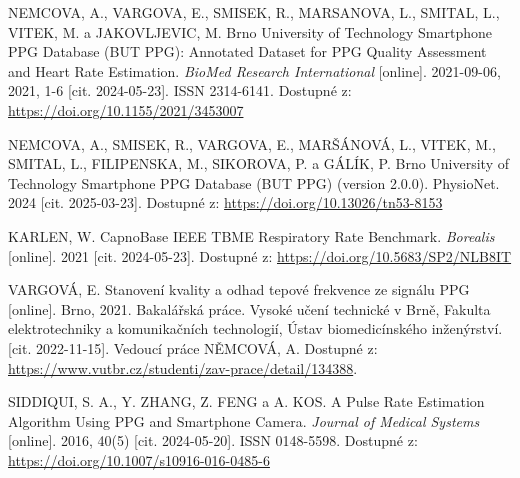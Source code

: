 

\begin{thebibliography}{99}

		NEMCOVA, A., VARGOVA, E., SMISEK, R., MARSANOVA, L., SMITAL, L., VITEK, M. a JAKOVLJEVIC, M.
		Brno University of Technology Smartphone PPG Database (BUT PPG): Annotated Dataset for PPG Quality Assessment and Heart Rate Estimation.
		\emph{BioMed Research International} [online].
		2021-09-06, 2021, 1-6 [cit. 2024-05-23].
		ISSN 2314-6141.
		Dostupné z: \url{https://doi.org/10.1155/2021/3453007}

		NEMCOVA, A., SMISEK, R., VARGOVA, E., MARŠÁNOVÁ, L., VITEK, M., SMITAL, L., FILIPENSKA, M., SIKOROVA, P. a GÁLÍK, P.
		Brno University of Technology Smartphone PPG Database (BUT PPG) (version 2.0.0).
		PhysioNet.
		2024 [cit. 2025-03-23].
		Dostupné z: \url{https://doi.org/10.13026/tn53-8153}

		KARLEN, W.
		CapnoBase IEEE TBME Respiratory Rate Benchmark.
		\emph{Borealis} [online].
		2021 [cit. 2024-05-23].
		Dostupné z: \url{https://doi.org/10.5683/SP2/NLB8IT}

		VARGOVÁ, E. Stanovení kvality a odhad tepové frekvence ze signálu PPG [online].
		Brno, 2021. Bakalářská práce. Vysoké učení technické v Brně, Fakulta elektrotechniky a komunikačních technologií, Ústav biomedicínského inženýrství.
		[cit. 2022-11-15].
		Vedoucí práce NĚMCOVÁ, A.
		Dostupné z: \url{https://www.vutbr.cz/studenti/zav-prace/detail/134388}.

		SIDDIQUI, S. A., Y. ZHANG, Z. FENG a A. KOS.
		A Pulse Rate Estimation Algorithm Using PPG and Smartphone Camera.
		\emph{Journal of Medical Systems} [online].
		2016, 40(5) [cit. 2024-05-20].
		ISSN 0148-5598.
		Dostupné z: \url{https://doi.org/10.1007/s10916-016-0485-6}


\end{thebibliography}

